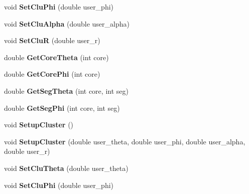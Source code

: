 \begin{DoxyCompactItemize}
\item 
\mbox{\label{class_m_b_geometry_a74142f84cf6317d52ae39c0e0ff8a87e}} 
void {\bfseries Set\+Clu\+Phi} (double user\+\_\+phi)
\item 
\mbox{\label{class_m_b_geometry_a0d4868b0360a6e5534918a9813540015}} 
void {\bfseries Set\+Clu\+Alpha} (double user\+\_\+alpha)
\item 
\mbox{\label{class_m_b_geometry_a292c4326421c78871667e91c3694ae35}} 
void {\bfseries Set\+CluR} (double user\+\_\+r)
\item 
\mbox{\label{class_m_b_geometry_a42aa536f15017724812712b0f8a77c12}} 
double {\bfseries Get\+Core\+Theta} (int core)
\item 
\mbox{\label{class_m_b_geometry_a39f685610ae0e68e547a46f8ef992599}} 
double {\bfseries Get\+Core\+Phi} (int core)
\item 
\mbox{\label{class_m_b_geometry_a49cdf742a2902fc85f0b24dfffa554a8}} 
double {\bfseries Get\+Seg\+Theta} (int core, int seg)
\item 
\mbox{\label{class_m_b_geometry_a575ddd6022d2d686a83ebce3195b6c50}} 
double {\bfseries Get\+Seg\+Phi} (int core, int seg)
\item 
\mbox{\label{class_m_b_geometry_a4d98a38f0dc1ca6a4a73477dde5cdd8d}} 
void {\bfseries Setup\+Cluster} ()
\item 
\mbox{\label{class_m_b_geometry_a93f157cebad3f63dbbefb5b08f3555af}} 
void {\bfseries Setup\+Cluster} (double user\+\_\+theta, double user\+\_\+phi, double user\+\_\+alpha, double user\+\_\+r)
\item 
\mbox{\label{class_m_b_geometry_a9a2a8c9609141be92d7ba30e6087aa30}} 
void {\bfseries Set\+Clu\+Theta} (double user\+\_\+theta)
\item 
\mbox{\label{class_m_b_geometry_a74142f84cf6317d52ae39c0e0ff8a87e}} 
void {\bfseries Set\+Clu\+Phi} (double user\+\_\+phi)

\end{DoxyCompactItemize}

